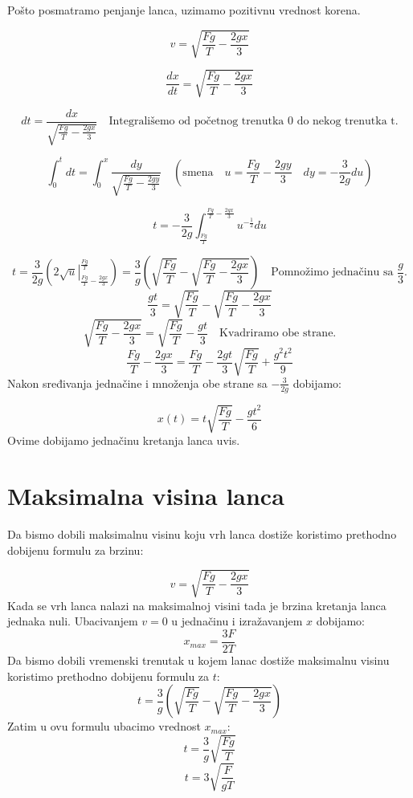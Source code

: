 \documentclass[a4paper]{article}
\begin{document}
Pošto posmatramo penjanje lanca, uzimamo pozitivnu vrednost 
korena.

\[
v = \sqrt{\frac{Fg}{T} - \frac{2gx}{3}}
\]

\[
\frac{dx}{dt} = \sqrt{\frac{Fg}{T} - \frac{2gx}{3}}
\]

\[
dt = \frac{dx}{\sqrt{\frac{Fg}{T} - \frac{2gx}{3}}} \quad \text{Integrališemo od početnog trenutka 0 do nekog trenutka t.}
\]

\[
\int_0^t dt = \int_0^x \frac{dy}{\sqrt{\frac{Fg}{T} - \frac{2gy}{3}}} \quad \left(\text{smena} \quad u=\frac{Fg}{T} - \frac{2gy}{3} \quad dy = - \frac{3}{2g}du \right)
\]

\[
t = -\frac{3}{2g} \int_{\frac{Fg}{T}}^{\frac{Fg}{T} - \frac{2gx}{3}} u^{-\frac{1}{2}}du
\]

\[
t = \frac{3}{2g} \left( \left. 2\sqrt{u} \right|_{\frac{Fg}{T} - \frac{2gx}{3}}^{\frac{Fg}{T}}   \right) = \frac{3}{g}\left(\sqrt{\frac{Fg}{T}} - \sqrt{\frac{Fg}{T} - \frac{2gx}{3}}\right) \quad \text{Pomnožimo jednačinu sa }\frac{g}{3}.
\]
\[
\frac{gt}{3} = \sqrt{\frac{Fg}{T}} - \sqrt{\frac{Fg}{T} - {\frac{2gx}{3}}} 
\]
\[
\sqrt{\frac{Fg}{T} - {\frac{2gx}{3}}} = \sqrt{\frac{Fg}{T}} - \frac{gt}{3} \quad \text{Kvadriramo obe strane.}
\]
\[
\frac{Fg}{T} - {\frac{2gx}{3}} = \frac{Fg}{T} - \frac{2gt}{3}\sqrt{\frac{Fg}{T}} + \frac{g^{2}t^{2}}{9} 
\]
Nakon sređivanja jednačine i množenja obe strane sa $-\frac{3}{2g}$ dobijamo:


\[
x\left(t\right) = t\sqrt{\frac{Fg}{T}} - \frac{gt^2}{6}
\]
Ovime dobijamo jednačinu kretanja lanca uvis.

\section{Maksimalna visina lanca}

Da bismo dobili maksimalnu visinu koju vrh lanca dostiže koristimo 
prethodno dobijenu formulu za brzinu:

\[
v = \sqrt{\frac{Fg}{T} - \frac{2gx}{3}}
\]
Kada se vrh lanca nalazi na maksimalnoj visini tada je brzina kretanja
lanca jednaka nuli. Ubacivanjem $v=0$ u jednačinu i izražavanjem
$x$ dobijamo:
\[
x_{max} = \frac{3F}{2T}
\]
Da bismo dobili vremenski trenutak u kojem lanac dostiže maksimalnu
visinu koristimo prethodno dobijenu formulu za $t$:
\[
t = \frac{3}{g}\left(\sqrt{\frac{Fg}{T}} - \sqrt{\frac{Fg}{T} - \frac{2gx}{3}}\right)
\]
Zatim u ovu formulu ubacimo vrednost $x_{max}$:
\[
t = \frac{3}{g}\sqrt{\frac{Fg}{T}}
\]
\[
t = 3\sqrt{\frac{F}{gT}}
\]
\end{document}
